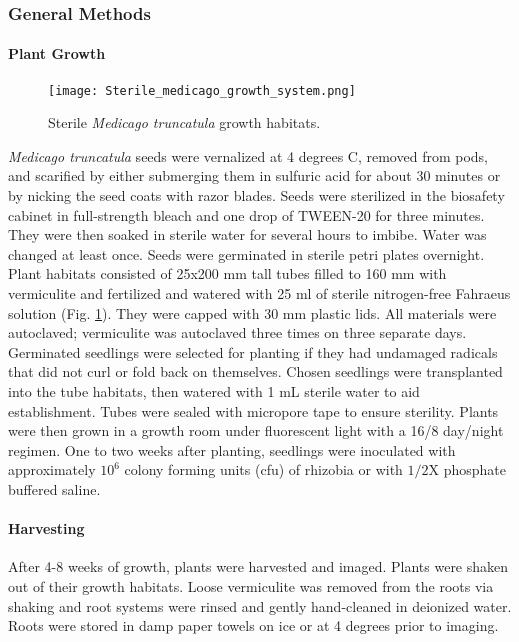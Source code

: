 \documentclass[12pt]{article}
\begin{document}
\begin{doublespace}
\subsubsection{General Methods}
\paragraph{Plant Growth}
		\begin{figure}[h!]
			\centering
			\texttt{[image: Sterile\_medicago\_growth\_system.png]}
			\caption{Sterile \textit{Medicago truncatula} growth habitats.}
			\label{fig:growthsystem}
		\end{figure}
\textit{Medicago truncatula} seeds were vernalized at 4 degrees C, removed from pods, and scarified by either submerging them in sulfuric acid for about 30 minutes or by nicking the seed coats with razor blades. Seeds were sterilized in the biosafety cabinet in full-strength bleach and one drop of TWEEN-20 for three minutes. They were then soaked in sterile water for several hours to imbibe. Water was changed at least once. Seeds were germinated in sterile petri plates overnight. Plant habitats consisted of 25x200 mm tall tubes filled to 160 mm with vermiculite and fertilized and watered with 25 ml of sterile nitrogen-free Fahraeus solution (Fig. \ref{fig:growthsystem}). They were capped with 30 mm plastic lids. All materials were autoclaved; vermiculite was autoclaved three times on three separate days. Germinated seedlings were selected for planting if they had undamaged radicals that did not curl or fold back on themselves. Chosen seedlings were transplanted into the tube habitats, then watered with 1 mL sterile water to aid establishment. Tubes were sealed with micropore tape to ensure sterility. Plants were then grown in a growth room under fluorescent light with a 16/8 day/night regimen. One to two weeks after planting, seedlings were inoculated with approximately $10^6$ colony forming units (cfu) of rhizobia or with $1/2$X phosphate buffered saline.

\paragraph{Harvesting}
After 4-8 weeks of growth, plants were harvested and imaged. Plants were shaken out of their growth habitats. Loose vermiculite was removed from the roots via shaking and root systems were rinsed and gently hand-cleaned in deionized water. Roots were stored in damp paper towels on ice or at 4 degrees prior to imaging.


\end{doublespace}
\end{document}
